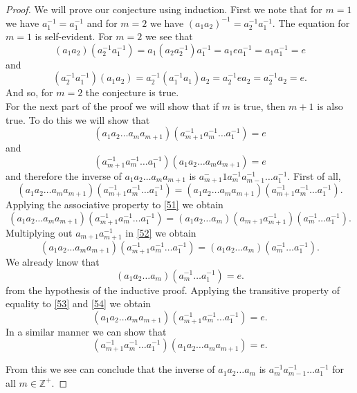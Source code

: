 \documentclass[11pt,a4paper]{article}
\begin{document}
\begin{proof}
We will prove our conjecture using induction. First we note that for $m=1$ we have $a_1^{-1} = a_1^{-1}$ and for $m=2$ we have $(a_1a_2)^{-1} = a_2^{-1}a_1^{-1}$. The equation for $m=1$ is self-evident. For $m=2$ we see that
\[(a_1a_2)(a_2^{-1}a_1^{-1}) = a_1(a_2a_2^{-1})a_1^{-1} = a_1ea_1^{-1} = a_1a_1^{-1} = e\]
and
\[(a_2^{-1}a_1^{-1})(a_1a_2) = a_2^{-1}(a_1^{-1}a_1)a_2 = a_2^{-1}ea_2 = a_2^{-1}a_2 = e.\]
And so, for $m=2$ the conjecture is true.
~\\
For the next part of the proof we will show that if $m$ is true, then $m+1$ is also true. To do this we will show that 
\[(a_1 a_2 \ldots a_m a_{m+1})(a_{m+1}^{-1} a_m^{-1}\ldots a_1^{-1}) = e\]
and
\[(a_{m+1}^{-1} a_m^{-1}\ldots a_1^{-1})(a_1 a_2 \ldots a_m a_{m+1}) = e\]
and therefore the inverse of  $a_1 a_2 \ldots a_m a_{m+1}$ is $a_{m+1}^-1 a_m^{-1}a_{m-1}^{-1}\ldots a_1^{-1}$. First of all,
\begin{equation}\label{51}
(a_1 a_2 \ldots a_m a_{m+1})(a_{m+1}^{-1} a_m^{-1}\ldots a_1^{-1}) = (a_1 a_2 \ldots a_m a_{m+1})(a_{m+1}^{-1} a_m^{-1}\ldots a_1^{-1}).
\end{equation}
Applying the associative property to \eqref{51} we obtain
\begin{equation}\label{52}
(a_1 a_2 \ldots a_m a_{m+1})(a_{m+1}^{-1} a_m^{-1}\ldots a_1^{-1}) = (a_1 a_2 \ldots a_m) (a_{m+1}a_{m+1}^{-1})( a_m^{-1}\ldots a_1^{-1}).
\end{equation}
Multiplying out $a_{m+1}a_{m+1}^{-1}$ in \eqref{52} we obtain
\begin{equation}\label{53}
(a_1 a_2 \ldots a_m a_{m+1})(a_{m+1}^{-1} a_m^{-1}\ldots a_1^{-1}) = (a_1 a_2 \ldots a_m)( a_m^{-1}\ldots a_1^{-1}).
\end{equation}
We already know that 
\begin{equation}\label{54}
(a_1 a_2 \ldots a_m)( a_m^{-1}\ldots a_1^{-1}) = e.
\end{equation}
from the hypothesis of the inductive proof. Applying the transitive property of equality to \eqref{53} and \eqref{54} we obtain
\begin{equation}
(a_1 a_2 \ldots a_m a_{m+1})(a_{m+1}^{-1} a_m^{-1}\ldots a_1^{-1}) = e.
\end{equation}
In a similar manner we can show that
\[(a_{m+1}^{-1} a_m^{-1}\ldots a_1^{-1})(a_1 a_2 \ldots a_m a_{m+1}) = e. \]

From this we see can conclude that the inverse of $a_1 a_2 \ldots a_m$ is $a_m^{-1}a_{m-1}^{-1}\ldots a_1^{-1}$ for all $m\in\mathbb{Z^+}$.


\end{proof}
\end{document}
